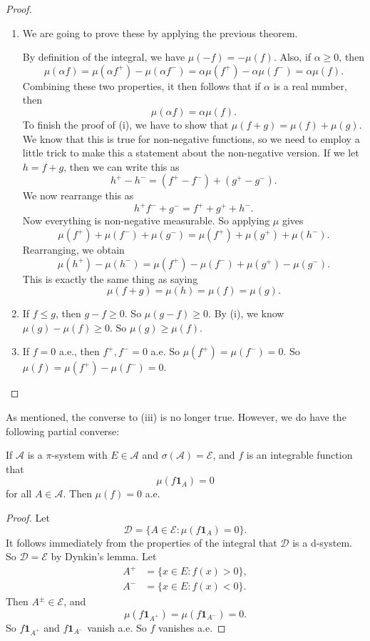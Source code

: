 \documentclass[a4paper]{article}
\begin{document}
\begin{proof}\leavevmode
  \begin{enumerate}
    \item We are going to prove these by applying the previous theorem.

      By definition of the integral, we have $\mu(-f) = - \mu(f)$. Also, if $\alpha \geq 0$, then
      \[
        \mu(\alpha f) = \mu(\alpha f^+) - \mu(\alpha f^-) = \alpha \mu(f^+) - \alpha \mu(f^-) = \alpha \mu(f).
      \]
      Combining these two properties, it then follows that if $\alpha$ is a real number, then
      \[
        \mu(\alpha f) = \alpha \mu(f).
      \]
      To finish the proof of (i), we have to show that $\mu(f + g) = \mu(f) + \mu(g)$. We know that this is true for non-negative functions, so we need to employ a little trick to make this a statement about the non-negative version. If we let $h = f + g$, then we can write this as
      \[
        h^+ - h^- = (f^+ - f^-) + (g^+ - g^-).
      \]
      We now rearrange this as
      \[
        h^ + f^- + g^- = f^+ + g^+ + h^-.
      \]
      Now everything is non-negative measurable. So applying $\mu$ gives
      \[
        \mu(f^+) + \mu(f^-) + \mu(g^-) = \mu(f^+) + \mu(g^+) + \mu(h^-).
      \]
      Rearranging, we obtain
      \[
        \mu(h^+) - \mu (h^-) = \mu(f^+) - \mu(f^-) + \mu(g^+) - \mu(g^-).
      \]
      This is exactly the same thing as saying
      \[
        \mu(f + g) = \mu(h) = \mu(f) = \mu(g).
      \]
    \item If $f \leq g$, then $g - f \geq 0$. So $\mu(g - f) \geq 0$. By (i), we know $\mu(g) - \mu(f) \geq 0$. So $\mu(g) \geq \mu(f)$.

    \item If $f = 0$ a.e., then $f^+, f^- = 0$ a.e. So $\mu(f^+) = \mu(f^-) = 0$. So $\mu(f) = \mu(f^+) - \mu(f^-) = 0$.\qedhere
  \end{enumerate}
\end{proof}
As mentioned, the converse to (iii) is no longer true. However, we do have the following partial converse:
\begin{prop}
  If $\mathcal{A}$ is a $\pi$-system with $E \in \mathcal{A}$ and $\sigma(\mathcal{A}) = \mathcal{E}$, and $f$ is an integrable function that
  \[
    \mu(f\mathbf{1}_A) =0
  \]
  for all $A \in \mathcal{A}$. Then $\mu(f) = 0$ a.e.
\end{prop}

\begin{proof}
  Let
  \[
    \mathcal{D} = \{A \in \mathcal{E}: \mu (f\mathbf{1}_A) = 0\}.
  \]
  It follows immediately from the properties of the integral that $\mathcal{D}$ is a d-system. So $\mathcal{D} = \mathcal{E}$ by Dynkin's lemma. Let
  \begin{align*}
    A^+ &= \{x \in E: f(x) > 0\},\\
    A^- &= \{x \in E: f(x) < 0\}.
  \end{align*}
  Then $A^{\pm} \in \mathcal{E}$, and
  \[
    \mu(f \mathbf{1}_{A^+}) = \mu(f \mathbf{1}_{A^-}) = 0.
  \]
  So $f\mathbf{1}_{A^+}$ and $f \mathbf{1}_{A^-}$ vanish a.e. So $f$ vanishes a.e.
\end{proof}
\end{document}
